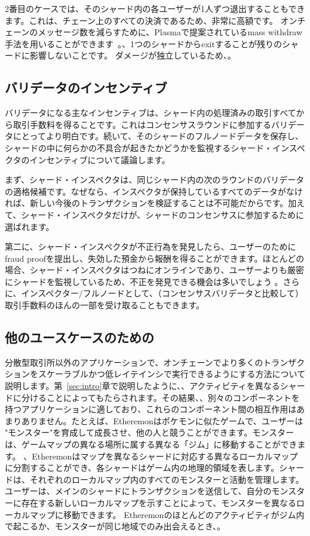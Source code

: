 2番目のケースでは、そのシャード内の各ユーザーが1人ずつ退出することもできます。これは、チェーン上のすべての決済であるため、非常に高額です。 オンチェーンのメッセージ数を減らすために、Plasmaで提案されているmass withdraw手法を用いることができます~\cite{plasma}。、1つのシャードからexitすることが残りのシャードに影響しないことです。 ダメージが独立しているため、。

\subsection{バリデータのインセンティブ}
バリデータになる主なインセンティブは、シャード内の処理済みの取引すべてから取引手数料を得ることです。これはコンセンサスラウンドに参加するバリデータにとってより明白です。続いて、そのシャードのフルノードデータを保存し、シャードの中に何らかの不具合が起きたかどうかを監視するシャード・インスペクタのインセンティブについて議論します。

まず、シャード・インスペクタは、同じシャード内の次のラウンドのバリデータの適格候補です。なぜなら、インスペクタが保持しているすべてのデータがなければ、新しい今後のトランザクションを検証することは不可能だからです。加えて、シャード・インスペクタだけが、シャードのコンセンサスに参加するために選ばれます。

第二に、シャード・インスペクタが不正行為を発見したら、ユーザーのためにfraud proofを提出し、失効した預金から報酬を得ることができます。ほとんどの場合、シャード・インスペクタはつねにオンラインであり、ユーザーよりも厳密にシャードを監視しているため、不正を発見できる機会は多いでしょう 。さらに、インスペクター/フルノードとして、（コンセンサスバリデータと比較して）取引手数料のほんの一部を受け取ることもできます。

\subsection{他のユースケースのための\codename}
\label{sec:others}

分散型取引所以外のアプリケーションで、オンチェーンでより多くのトランザクションをスケーラブルかつ低レイテインシで実行できるようにする方法について説明します。第~\ref{sec:intro}章で説明したように、、アクティビティを異なるシャードに分けることによってもたらされます。その結果、、別々のコンポーネントを持つアプリケーションに適しており、これらのコンポーネント間の相互作用はあまりありません。たとえば、Etheremonはポケモンに似たゲームで、ユーザーは "モンスター"を育成して成長させ、他の人と競うことができます。モンスターは、ゲームマップの異なる場所に属する異なる「ジム」に移動することができます。 、Etheremonはマップを異なるシャードに対応する異なるローカルマップに分割することができ、各シャードはゲーム内の地理的領域を表します。シャードは、それぞれのローカルマップ内のすべてのモンスターと活動を管理します。ユーザーは、メインのシャードにトランザクションを送信して、自分のモンスターに存在する新しいローカルマップを示すことによって、モンスターを異なるローカルマップに移動できます。 Etheremonのほとんどのアクティビティがジム内で起こるか、モンスターが同じ地域でのみ出会えるとき、。

